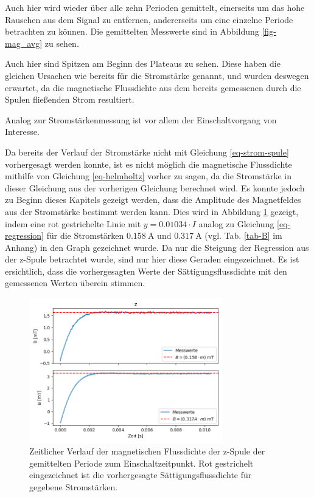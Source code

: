 \documentclass[page,pdftex,12pt,a4paper,twoside,openright]{scrbook}
\begin{document}
Auch hier wird wieder über alle zehn Perioden gemittelt, einerseits um das hohe Rauschen aus dem Signal zu entfernen, andererseits um eine einzelne Periode betrachten zu können. Die gemittelten Messwerte sind in Abbildung \ref{fig-mag_avg} zu sehen.

Auch hier sind Spitzen am Beginn des Plateaus zu sehen. Diese haben die gleichen Ursachen wie bereits für die Stromstärke genannt, und wurden deswegen erwartet, da die magnetische Flussdichte aus dem bereits gemessenen durch die Spulen fließenden Strom resultiert.

Analog zur Stromstärkenmessung ist vor allem der Einschaltvorgang von Interesse.

Da bereits der Verlauf der Stromstärke nicht mit Gleichung \ref{eq-strom-spule} vorhergesagt werden konnte, ist es nicht möglich die magnetische Flussdichte mithilfe von Gleichung \ref{eq-helmholtz} vorher zu sagen, da die Stromstärke in dieser Gleichung aus der vorherigen Gleichung berechnet wird. Es konnte jedoch zu Beginn dieses Kapitels gezeigt werden, dass die Amplitude des Magnetfeldes aus der Stromstärke bestimmt werden kann. Dies wird in Abbildung \ref{fig-mag_fit} gezeigt, indem eine rot gestrichelte Linie mit \(y = 0.01034 \cdot I\) analog zu Gleichung \ref{eq-regression} für die Stromstärken \(\SI{0.158}{\ampere}\) und \(\SI{0.317}{\ampere}\) (vgl. Tab. \ref{tab-B} im Anhang) in den Graph gezeichnet wurde. Da nur die Steigung der Regression aus der z-Spule betrachtet wurde, sind nur hier diese Geraden eingezeichnet. Es ist ersichtlich, dass die vorhergesagten Werte der Sättigungsflussdichte mit den gemessenen Werten überein stimmen. 

\begin{figure}[h]
\centering
\includegraphics[width=0.75\textwidth]{img/mag_fit.png}
\caption{\label{fig-mag_fit}
Zeitlicher Verlauf der magnetischen Flussdichte der z-Spule der gemittelten Periode zum Einschaltzeitpunkt. Rot gestrichelt eingezeichnet ist die vorhergesagte Sättigungsflussdichte für gegebene Stromstärken.}
\end{figure}
\end{document}
